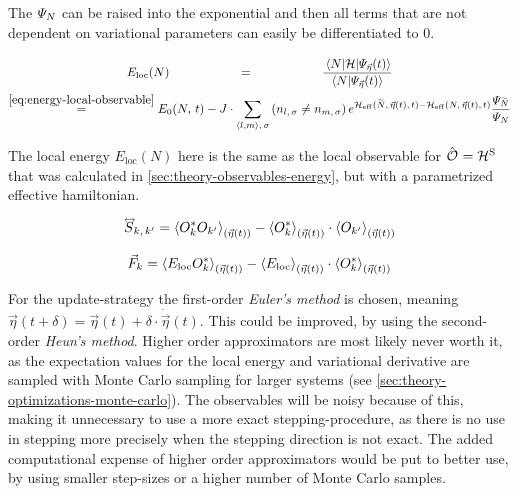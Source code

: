 The $\psiN$ can be raised into the exponential and then all terms that are not dependent on variational parameters can easily be differentiated to 0.

\begin{equation}
    \label{eq:local-energy-definition}
    \begin{gathered}
        E_\text{loc}(N) \stackrel{\phantom{\ref{eq:energy-local-observable}}}{=} \frac{
            \bracketHelper{N}{\hamiltonian}{\psiEta{\vec{\eta}}{t}}
        }{
            \braketHelper{N}{\psiEta{\vec{\eta}}{t}}
        } 
        \\
        \stackrel{\ref{eq:energy-local-observable}}{=}
        E_0(N,\,t)-
        J \cdot \neighborsumWSpin{l}{m}{\sigma}
        \left(n_{l,\,\sigma} \neq n_{m,\,\sigma}\right)
            e^{\HeffOft[\vphantom{N}\smash{\tilde{N}},\,\vec{\eta}(t)]-\HeffOft[N,\,\vec{\eta}(t)]}
        \frac{
            \psiN[\vphantom{N}\smash{\tilde{N}}]
        }{
            \psiN[N]
        }
    \end{gathered}
\end{equation}

The local energy $E_\text{loc}(N)$ here is the same as the local observable  for $\ObservableOp = \pictureHamiltonian[\schroedingerPicture]$ that was calculated in \autoref{sec:theory-observables-energy}, but with a parametrized effective hamiltonian.

\begin{equation}
    \label{eq:covariance-matrix}
    \matvec{S}_{k,\, k'} = \etaExpectationVal{O_{k}^\ast O_{k'}} - \etaExpectationVal{O_{k}^\ast} \cdot \etaExpectationVal{O_{k'} \vphantom{O_{k}^\ast}}
\end{equation}

\begin{equation}
    \label{eq:tdvp-force}
    \vec{F}_k = \etaExpectationVal{E_\text{loc} O_{k}^\ast} - \etaExpectationVal{E_\text{loc}  \vphantom{O_{k}^\ast}} \cdot \etaExpectationVal{O_{k}^\ast}
\end{equation}


For the update-strategy the first-order \emph{Euler's method} is chosen, meaning $\vec{\eta}(t + \delta) = \vec{\eta}(t) + \delta \cdot \dot{\vec{\eta}}(t)$.
This could be improved, by using the second-order \emph{Heun's method}. 
Higher order approximators are most likely never worth it, as the expectation values for the local energy and variational derivative are sampled with Monte Carlo sampling for larger systems (see \autoref{sec:theory-optimizations-monte-carlo}).
The observables will be noisy because of this, making it unnecessary to use a more exact stepping-procedure, as there is no use in stepping more precisely when the stepping direction is not exact.
The added computational expense of higher order approximators would be put to better use, by using smaller step-sizes or a higher number of Monte Carlo samples.

